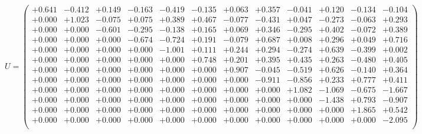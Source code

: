 \documentclass[9pt]{article}
\theoremstyle{plain}
\theoremstyle{definition}
\theoremstyle{remark}
\numberwithin{equation}{section}
\begin{document}
$U = \left(
\begin{array}{
cccccccccccc}
+0.641 & -0.412 & +0.149 & -0.163 & -0.419 & -0.135 & +0.063 & +0.357 & -0.041 & +0.120 & -0.134 & -0.104 \\
+0.000 & +1.023 & -0.075 & +0.075 & +0.389 & +0.467 & -0.077 & -0.431 & +0.047 & -0.273 & -0.063 & +0.293 \\
+0.000 & +0.000 & -0.601 & -0.295 & -0.138 & +0.165 & +0.069 & +0.346 & -0.295 & +0.402 & -0.072 & +0.389 \\
+0.000 & +0.000 & +0.000 & -0.674 & -0.724 & +0.191 & -0.079 & +0.687 & +0.008 & +0.296 & +0.049 & +0.716 \\
+0.000 & +0.000 & +0.000 & +0.000 & -1.001 & +0.111 & +0.244 & +0.294 & -0.274 & +0.639 & -0.399 & +0.002 \\
+0.000 & +0.000 & +0.000 & +0.000 & +0.000 & +0.748 & +0.201 & +0.395 & +0.435 & +0.263 & -0.480 & +0.405 \\
+0.000 & +0.000 & +0.000 & +0.000 & +0.000 & +0.000 & +0.907 & -0.045 & -0.519 & +0.626 & -0.140 & +0.364 \\
+0.000 & +0.000 & +0.000 & +0.000 & +0.000 & +0.000 & +0.000 & -0.911 & -0.856 & +0.233 & +0.777 & +0.411 \\
+0.000 & +0.000 & +0.000 & +0.000 & +0.000 & +0.000 & +0.000 & +0.000 & +1.082 & -1.069 & -0.675 & -1.667 \\
+0.000 & +0.000 & +0.000 & +0.000 & +0.000 & +0.000 & +0.000 & +0.000 & +0.000 & -1.438 & +0.793 & -0.907 \\
+0.000 & +0.000 & +0.000 & +0.000 & +0.000 & +0.000 & +0.000 & +0.000 & +0.000 & +0.000 & +1.865 & +0.542 \\
+0.000 & +0.000 & +0.000 & +0.000 & +0.000 & +0.000 & +0.000 & +0.000 & +0.000 & +0.000 & +0.000 & -2.095 \\
\end{array}
\right)$ \newline 
\end{document}
